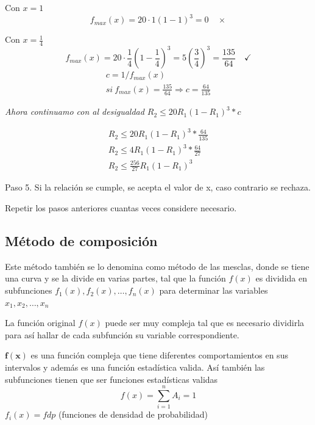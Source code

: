 \documentclass[11pt,letterpaper]{report}
\begin{document}
Con $x = 1$
\[
f_{max}(x) = 20 \cdot 1(1-1)^3 = 0 \quad \times
\]

Con $x = \frac{1}{4}$
\[
f_{max}(x) = 20 \cdot \frac{1}{4}\left(1 - \frac{1}{4}\right)^3 = 5\left(\frac{3}{4}\right)^3 = \frac{135}{64} \quad \checkmark
\]
\begin{gather*}
c = 1/f_{max}(x)\\
si\ f_{max}(x) = \frac{135}{64} \Rightarrow c = \frac{64}{135}
\end{gather*}
\begin{center}
\textit{Ahora continuamo con al desigualdad $R_2 \leq 20R_1(1 - R_1)^3 * c$}
\end{center}
\begin{gather*}
R_2 \leq 20R_1(1 - R_1)^3 * \frac{64}{135}\\
R_2 \leq 4R_1(1 - R_1)^3 * \frac{64}{27}\\
\boxed{R_2 \leq \frac{256}{27}R_1(1 - R_1)^3}
\end{gather*}

Paso 5. Si la relación se cumple, se acepta el valor de x, caso contrario se rechaza.

Repetir los pasos anteriores cuantas veces considere necesario.

\subsection*{Método de composición}

Este método también se lo denomina como método de las mesclas, donde se tiene una curva y se la divide en varias partes, tal que la función $f(x)$ es dividida en subfunciones $f_1(x), f_2(x), \ldots, f_n(x)$ para determinar las variables $x_1, x_2, \ldots, x_n$

La función original $f(x)$ puede ser muy compleja tal que es necesario dividirla para así hallar de cada subfunción su variable correspondiente.

\begin{center}
\end{center}

$\boldsymbol{f(x)}$ es una función compleja que tiene diferentes comportamientos en sus intervalos y además es una función estadística valida. Así también las subfunciones tienen que ser funciones estadísticas validas
\[
f(x) = \sum_{i=1}^{n} A_i = 1
\]
$f_i(x) = fdp$ (funciones de densidad de probabilidad)
\end{document}
